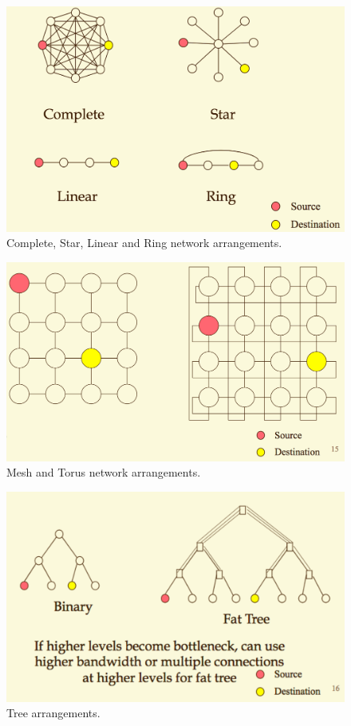 \begin{figure}
\centering
\includegraphics[width=0.7\linewidth]{screenshot123}
\caption{Complete, Star, Linear and Ring network arrangements.}
\label{fig:screenshot123}
\end{figure}

\begin{figure}
\centering
\includegraphics[width=0.7\linewidth]{screenshot124}
\caption{Mesh and Torus network arrangements.}
\label{fig:screenshot124}
\end{figure}

\begin{figure}
\centering
\includegraphics[width=0.7\linewidth]{screenshot125}
\caption{Tree arrangements.}
\label{fig:screenshot125}
\end{figure}

\pagebreak

